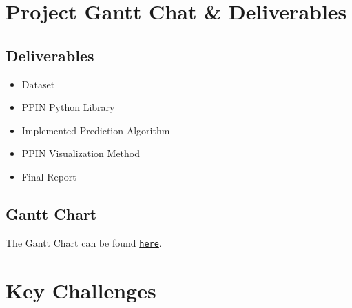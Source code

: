 

\section{Project Gantt Chat \& Deliverables}
\subsection{Deliverables}
\begin{itemize}
    \item Dataset
    \item PPIN Python Library 
    \item Implemented Prediction Algorithm
    \item PPIN Visualization Method
    \item Final Report
\end{itemize}

\subsection{Gantt Chart}
The Gantt Chart can be found \href{https://docs.google.com/spreadsheets/d/177G2Ug8ePJ5wdr1S0T3gbmti7pWHkpZjnaGsunB9-Pk/edit?usp=sharing}{\texttt{here}}.

\section{Key Challenges}

